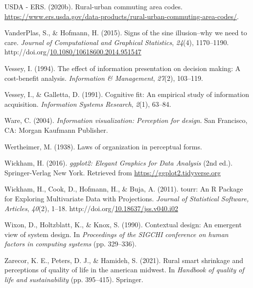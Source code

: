 \documentclass[print]{nuthesis}
\newlength{\cslhangindent}
\newenvironment{CSLReferences}[2]%
{\setlength{\parindent}{0pt}%
\everypar{\setlength{\hangindent}{\cslhangindent}}\ignorespaces}%
{\par}
\begin{document}
\begin{CSLReferences}{1}{0}
\leavevmode\hypertarget{ref-usda}{}%
USDA - ERS. (2020b). Rural-urban commuting area codes. \url{https://www.ers.usda.gov/data-products/rural-urban-commuting-area-codes/}.

\leavevmode\hypertarget{ref-sineillusion}{}%
VanderPlas, S., \& Hofmann, H. (2015). Signs of the sine illusion--why we need to care. \emph{Journal of Computational and Graphical Statistics}, \emph{24}(4), 1170--1190. http://doi.org/\href{https://doi.org/10.1080/10618600.2014.951547}{10.1080/10618600.2014.951547}

\leavevmode\hypertarget{ref-vessey1994}{}%
Vessey, I. (1994). The effect of information presentation on decision making: A cost-benefit analysis. \emph{Information \& Management}, \emph{27}(2), 103--119.

\leavevmode\hypertarget{ref-vessey1991}{}%
Vessey, I., \& Galletta, D. (1991). Cognitive fit: An empirical study of information acquisition. \emph{Information Systems Research}, \emph{2}(1), 63--84.

\leavevmode\hypertarget{ref-Ware2004}{}%
Ware, C. (2004). \emph{Information visualization: Perception for design}. San Francisco, CA: Morgan Kaufmann Publisher.

\leavevmode\hypertarget{ref-wertheimer1938}{}%
Wertheimer, M. (1938). Laws of organization in perceptual forms.

\leavevmode\hypertarget{ref-ggplot2}{}%
Wickham, H. (2016). \emph{{ggplot2: Elegant Graphics for Data Analysis}} (2nd ed.). Springer-Verlag New York. Retrieved from \url{https://ggplot2.tidyverse.org}

\leavevmode\hypertarget{ref-tourr}{}%
Wickham, H., Cook, D., Hofmann, H., \& Buja, A. (2011). {tourr: An R Package for Exploring Multivariate Data with Projections}. \emph{Journal of Statistical Software, Articles}, \emph{40}(2), 1--18. http://doi.org/\href{https://doi.org/10.18637/jss.v040.i02}{10.18637/jss.v040.i02}

\leavevmode\hypertarget{ref-wixon1990}{}%
Wixon, D., Holtzblatt, K., \& Knox, S. (1990). Contextual design: An emergent view of system design. In \emph{Proceedings of the SIGCHI conference on human factors in computing systems} (pp. 329--336).

\leavevmode\hypertarget{ref-zarecor2021rural}{}%
Zarecor, K. E., Peters, D. J., \& Hamideh, S. (2021). Rural smart shrinkage and perceptions of quality of life in the american midwest. In \emph{Handbook of quality of life and sustainability} (pp. 395--415). Springer.

\end{CSLReferences}
\end{document}
